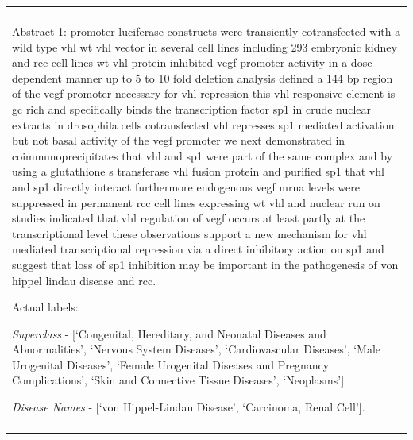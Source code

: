 \newenvironment{boxet}
    {\begin{center}
    \begin{tabular}{|p{0.9\textwidth}|}
    \hline\\
    }
    { 
    \\\\\hline
    \end{tabular} 
    \end{center}
    }
\begin{boxet}
Abstract 1: \textsf{promoter luciferase constructs were transiently cotransfected with a wild type vhl wt vhl vector in several cell lines including 293 embryonic kidney and rcc cell lines wt vhl protein inhibited vegf promoter activity in a dose dependent manner up to 5 to 10 fold deletion analysis defined a 144 bp region of the vegf promoter necessary for vhl repression this vhl responsive element is gc rich and specifically binds the transcription factor sp1 in crude nuclear extracts in drosophila cells cotransfected vhl represses sp1 mediated activation but not basal activity of the vegf promoter we next demonstrated in coimmunoprecipitates that vhl and sp1 were part of the same complex and by using a glutathione s transferase vhl fusion protein and purified sp1 that vhl and sp1 directly interact furthermore endogenous vegf mrna levels were suppressed in permanent rcc cell lines expressing wt vhl and nuclear run on studies indicated that vhl regulation of vegf occurs at least partly at the transcriptional level these observations support a new mechanism for vhl mediated transcriptional repression via a direct inhibitory action on sp1 and suggest that loss of sp1 inhibition may be important in the pathogenesis of von hippel lindau disease and rcc.}

Actual labels: 

\emph{Superclass} - [`Congenital, Hereditary, and Neonatal Diseases and Abnormalities', `Nervous System Diseases', `Cardiovascular Diseases', `Male Urogenital Diseases', `Female Urogenital Diseases and Pregnancy Complications', `Skin and Connective Tissue Diseases', `Neoplasms']

\emph{Disease Names} - [`von Hippel-Lindau Disease', `Carcinoma, Renal Cell'].
\end{boxet}

